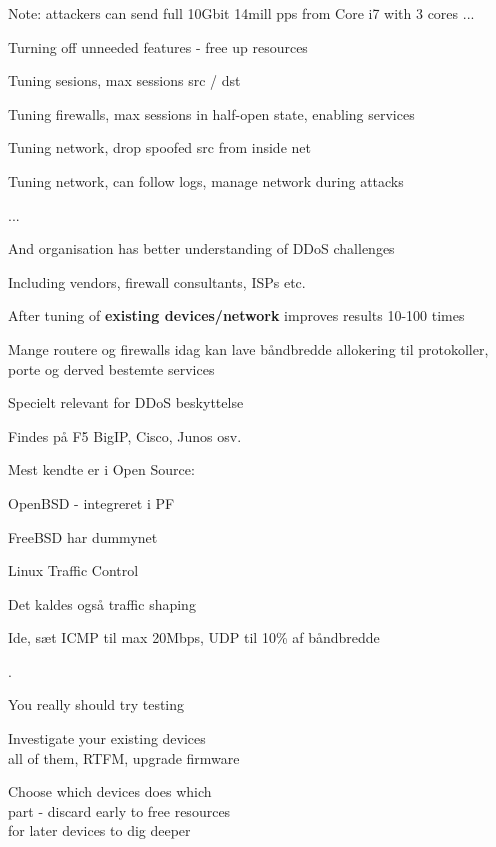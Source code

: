 \documentclass[Screen16to9,17pt]{foils}
\begin{document}
Note: attackers can send full 10Gbit 14mill pps from Core i7 with 3 cores ...



\begin{list1}
\item Turning off unneeded features - free up resources
\item Tuning sesions, max sessions src / dst
\item Tuning firewalls, max sessions in half-open state, enabling services
\item Tuning network, drop spoofed src from inside net \smiley
\item Tuning network, can follow logs, manage network during attacks
\item ...
\item And organisation has better understanding of DDoS challenges
\item Including vendors, firewall consultants, ISPs etc.
\end{list1}

\vskip 1cm
\centerline{After tuning of {\bf existing devices/network} improves results 10-100 times}


\begin{list1}
\item Mange routere og firewalls idag kan lave båndbredde allokering til
  protokoller, porte og derved bestemte services
  \item Specielt relevant for DDoS beskyttelse
  \item Findes på F5 BigIP, Cisco, Junos osv.
\item Mest kendte er i Open Source:
\begin{list2}
\item OpenBSD - integreret i PF
\item FreeBSD har dummynet
\item Linux Traffic Control
\end{list2}
\item Det kaldes også traffic shaping
\item Ide, sæt ICMP til max 20Mbps, UDP til 10\% af båndbredde
\end{list1}



.
\begin{list1}
\item You really should try testing
\item Investigate your existing devices\\
all of them, RTFM, upgrade firmware
\item Choose which devices does which\\
part - discard early to free resources\\
for later devices to dig deeper
\end{list1}
\end{document}
